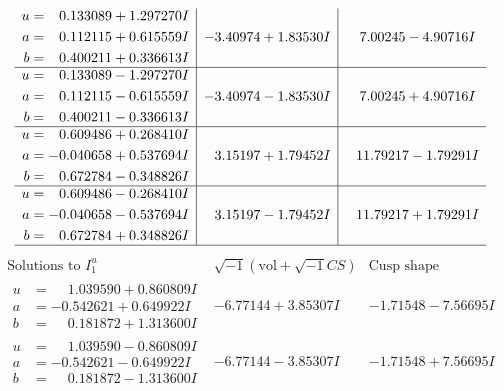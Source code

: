 \documentclass[1p]{elsarticle_modified}
\theoremstyle{definition}
\newcommand{\I}{\sqrt{-1}}
\begin{document}
$$\begin{array}{c|c|c}
\begin{aligned}
u &= \phantom{-}0.133089 + 1.297270 I \\
a &= \phantom{-}0.112115 + 0.615559 I \\
b &= \phantom{-}0.400211 + 0.336613 I\end{aligned}
 & -3.40974 + 1.83530 I & \phantom{-}7.00245 - 4.90716 I \\ \hline\begin{aligned}
u &= \phantom{-}0.133089 - 1.297270 I \\
a &= \phantom{-}0.112115 - 0.615559 I \\
b &= \phantom{-}0.400211 - 0.336613 I\end{aligned}
 & -3.40974 - 1.83530 I & \phantom{-}7.00245 + 4.90716 I \\ \hline\begin{aligned}
u &= \phantom{-}0.609486 + 0.268410 I \\
a &= -0.040658 + 0.537694 I \\
b &= \phantom{-}0.672784 - 0.348826 I\end{aligned}
 & \phantom{-}3.15197 + 1.79452 I & \phantom{-}11.79217 - 1.79291 I \\ \hline\begin{aligned}
u &= \phantom{-}0.609486 - 0.268410 I \\
a &= -0.040658 - 0.537694 I \\
b &= \phantom{-}0.672784 + 0.348826 I\end{aligned}
 & \phantom{-}3.15197 - 1.79452 I & \phantom{-}11.79217 + 1.79291 I\\
 \hline 
 \end{array}$$\newpage$$\begin{array}{c|c|c}  
\text{Solutions to }I^u_{1}& \I (\text{vol} + \sqrt{-1}CS) & \text{Cusp shape}\\
 \hline 
\begin{aligned}
u &= \phantom{-}1.039590 + 0.860809 I \\
a &= -0.542621 + 0.649922 I \\
b &= \phantom{-}0.181872 + 1.313600 I\end{aligned}
 & -6.77144 + 3.85307 I & -1.71548 - 7.56695 I \\ \hline\begin{aligned}
u &= \phantom{-}1.039590 - 0.860809 I \\
a &= -0.542621 - 0.649922 I \\
b &= \phantom{-}0.181872 - 1.313600 I\end{aligned}
 & -6.77144 - 3.85307 I & -1.71548 + 7.56695 I \\ \hline\begin{aligned}

\end{aligned}
\end{array}$$
\end{document}
